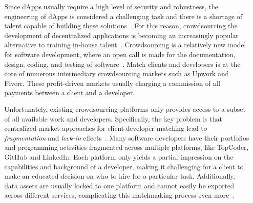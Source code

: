 Since dApps usually require a high level of security and robustness, the engineering of dApps is considered a challenging task and there is a shortage of talent capable of building these solutions~\cite{shortage2016nasdaq}.
For this reason, crowdsourcing the development of decentralized applications is becoming an increasingly popular alternative to training in-house talent~\cite{gong2021reference}.
Crowdsourcing is a relatively new model for software development, where an open call is made for the documentation, design, coding, and testing of software~\cite{latoza2016crowdsourcing}.
Match clients and developers is at the core of numerous intermediary crowdsourcing markets such as Upwork and Fiverr.
These profit-driven markets usually charging a commission of all payments between a client and a developer.

Unfortunately, existing crowdsourcing platforms only provides access to a subset of all available work and developers.
Specifically, the key problem is that centralized market approaches for client-developer matching lead to \emph{fragmentation} and \emph{lock-in} effects~\cite{pouwelse2017laws,gong2021reference}.
Many software developers have their portfolios and programming activities fragmented across multiple platforms, like TopCoder, GitHub and LinkedIn.
Each platform only yields a partial impression on the capabilities and background of a developer, making it challenging for a client to make an educated decision on who to hire for a particular task.
Additionally, data assets are usually locked to one platform and cannot easily be exported across different services, complicating this matchmaking process even more~\cite{hesse2019reputation}.



